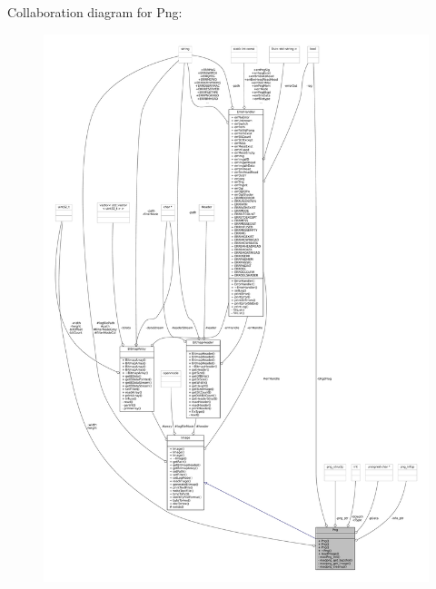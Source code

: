 Collaboration diagram for Png\+:\nopagebreak
\begin{figure}[H]
\begin{center}
\leavevmode
\includegraphics[width=350pt]{classPng__coll__graph}
\end{center}
\end{figure}
